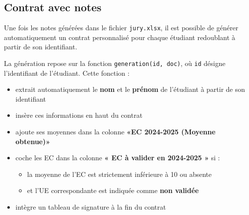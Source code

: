 \subsection{Contrat avec notes }

Une fois les notes générées dans le fichier \texttt{jury.xlsx}, il est possible de générer automatiquement un contrat personnalisé pour chaque étudiant redoublant à partir de son identifiant.

\vspace{0.5em}
La génération repose sur la fonction \texttt{generation(id, doc)}, où \texttt{id} désigne l'identifiant de l’étudiant. Cette fonction :
\begin{itemize}
    \item extrait automatiquement le \textbf{nom} et le \textbf{prénom} de l’étudiant à partir de son identifiant
    \item insère ces informations en haut du contrat
    \item ajoute ses moyennes dans la colonne \textbf{«EC 2024-2025 (Moyenne obtenue)»}
    \item coche les EC dans la colonne \textbf{« EC à valider en 2024-2025 »} si :
        \begin{itemize}
            \item la moyenne de l’EC est strictement inférieure à 10 ou absente
            \item et l’UE correspondante est indiquée comme \textbf{non validée}
        \end{itemize}
    \item intègre un tableau de signature à la fin du contrat
\end{itemize}

